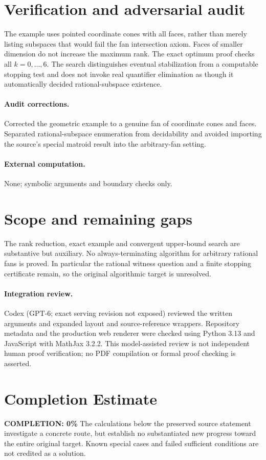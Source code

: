 \documentclass[11pt]{article}
\begin{document}
\section{Verification and adversarial audit}

The example uses pointed coordinate cones with all faces, rather than merely
listing subspaces that would fail the fan intersection axiom. Faces of smaller
dimension do not increase the maximum rank. The exact optimum proof checks
all $k=0,\ldots,6$. The search distinguishes eventual stabilization from a
computable stopping test and does not invoke real quantifier elimination as
though it automatically decided rational-subspace existence.

\paragraph{Audit corrections.} Corrected the geometric example to a genuine fan of coordinate cones and
faces. Separated rational-subspace enumeration from decidability and avoided
importing the source's special matroid result into the arbitrary-fan setting.
\paragraph{External computation.} None; symbolic arguments and boundary checks only.
\section{Scope and remaining gaps}

The rank reduction, exact example and convergent upper-bound search are
substantive but auxiliary. No always-terminating algorithm for arbitrary rational
fans is proved. In particular the rational witness question and a finite stopping
certificate remain, so the original algorithmic target is unresolved.

\paragraph{Integration review.} Codex (GPT-6; exact serving revision not exposed) reviewed the written arguments and expanded layout and source-reference wrappers. Repository metadata and the production web renderer were checked using Python 3.13 and JavaScript with MathJax 3.2.2. This model-assisted review is not independent human proof verification; no PDF compilation or formal proof checking is asserted.

\section{Completion Estimate}
\noindent\textbf{COMPLETION: 0\%}
The calculations below the preserved source statement investigate a concrete route,
but establish no substantiated new progress toward the entire original target.
Known special cases and failed sufficient conditions are not credited as a solution.
\end{document}
